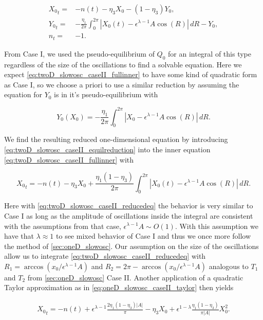 \begin{equation}\label{eq:twoD_slowosc_caseII_fullinner}
\begin{aligned}
{X_0}_t =& -n(t) -\eta_3 X_0- (1-\eta_3)Y_0,\\
{Y_0}_t =& -\frac{\eta_1}{2\pi}\int_0^{2\pi}|X_0(t)-\epsilon^{\lambda-1}A\cos(R)|\,dR -Y_0,\\
n_t=& -1.
\end{aligned}
\end{equation}

From Case I, we used the pseudo-equilibrium of $Q_0$ for an integral of this type regardless of the size of the oscillations to find a solvable equation. Here we expect \eqref{eq:twoD_slowosc_caseII_fullinner} to have some kind of quadratic form as Case I, so we choose a priori to use a similar reduction by assuming the equation for $Y_0$ is in it's pseudo-equilibrium with

\begin{equation}\label{eq:twoD_slowosc_caseII_equilreduction}
{Y_0}(X_0)= -\frac{\eta_1}{2\pi}\int_0^{2\pi}|X_0-\epsilon^{\lambda-1}A\cos(R)|\,dR.
\end{equation}

We find the resulting reduced one-dimensional equation by introducing \eqref{eq:twoD_slowosc_caseII_equilreduction} into the inner equation \eqref{eq:twoD_slowosc_caseII_fullinner} with

\begin{equation}\label{eq:twoD_slowosc_caseII_reducedeq}
{X_0}_t = -n(t)-\eta_3 X_0+\frac{\eta_1(1-\eta_3)}{2\pi}\int_0^{2\pi}|X_0(t)-\epsilon^{\lambda-1}A\cos(R)|\,dR.
\end{equation}

Here with \eqref{eq:twoD_slowosc_caseII_reducedeq} the behavior is very similar to Case I as long as the amplitude of oscillations inside the integral are consistent with the assumptions from that case, $\epsilon^{\lambda-1}A \sim O(1)$. With this assumption we have that $\lambda \approx 1$ to see mixed behavior of Case I and thus we once more follow the method of \autoref{sec:oneD_slowosc}. Our assumption on the size of the oscillations allow us to integrate \eqref{eq:twoD_slowosc_caseII_reducedeq} with $R_1= \arccos(x_0/\epsilon^{\lambda-1}A)$ and $R_2 = 2\pi - \arccos(x_0/\epsilon^{\lambda-1}A)$ analogous to $T_1$ and $T_2$ from \autoref{sec:oneD_slowosc} Case II. Another application of a quadratic Taylor approximation as in \eqref{eq:oneD_slowosc_caseII_taylor} then yields

\begin{equation}\label{eq:twoD_slowosc_caseII_taylor}
\begin{aligned}
{X_0}_t = -n(t) +\epsilon^{\lambda-1}\frac{2\eta_1(1-\eta_3)|A|}{\pi}-\eta_3 X_0 +\epsilon^{1-\lambda}\frac{\eta_1(1-\eta_3)}{\pi |A|}X_0^2.
\end{aligned}
\end{equation}

